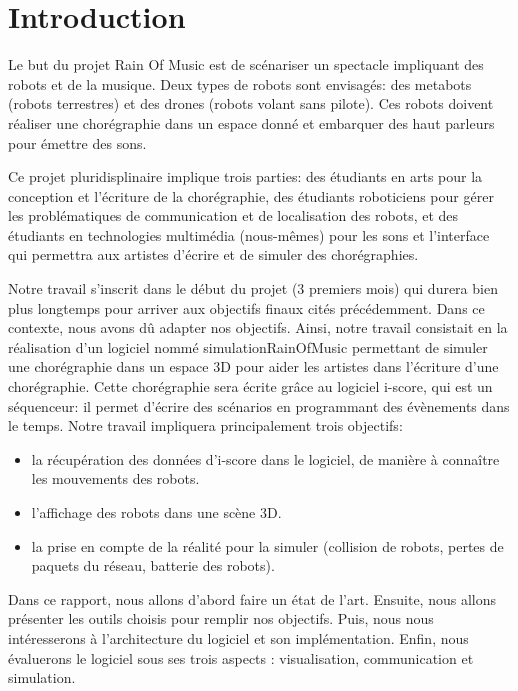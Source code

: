 \section{Introduction}

Le but du projet Rain Of Music est de scénariser un spectacle impliquant des robots et de la musique. Deux types de robots sont envisagés: des metabots (robots terrestres) et des drones (robots volant sans pilote). Ces robots doivent réaliser une chorégraphie dans un espace donné et embarquer des haut parleurs pour émettre des sons. 

Ce projet pluridisplinaire implique trois parties: des étudiants en arts pour la conception et l'écriture de la chorégraphie, des étudiants roboticiens pour gérer les problématiques de communication et de localisation des robots, et des étudiants en technologies multimédia (nous-mêmes) pour les sons et l'interface qui permettra aux artistes d'écrire et de simuler des chorégraphies. 


Notre travail s'inscrit dans le début du projet (3 premiers mois) qui durera bien plus longtemps pour arriver aux objectifs finaux cités précédemment. Dans ce contexte, nous avons dû adapter nos objectifs. Ainsi, notre travail consistait en la réalisation d'un logiciel nommé simulationRainOfMusic permettant de simuler une chorégraphie dans un espace 3D pour aider les artistes dans l'écriture d'une chorégraphie. Cette chorégraphie sera écrite grâce au logiciel i-score, qui est un séquenceur: il permet d'écrire des scénarios en programmant des évènements dans le temps. Notre travail impliquera principalement trois objectifs: 
\begin{itemize}
\item la récupération des données d'i-score dans le logiciel, de manière à connaître les mouvements des robots.
\item l'affichage des robots dans une scène 3D.
\item la prise en compte de la réalité pour la simuler (collision de robots, pertes de paquets du réseau, batterie des robots).
\end{itemize} 

Dans ce rapport, nous allons d'abord faire un état de l'art. Ensuite, nous allons présenter les outils choisis pour remplir nos objectifs. Puis, nous nous intéresserons à l'architecture du logiciel et son implémentation. Enfin, nous évaluerons le logiciel sous ses trois aspects : visualisation, communication et simulation.

